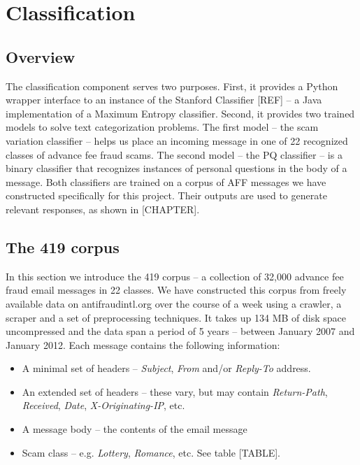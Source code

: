 \chapter{Classification}


\section{Overview}
The classification component serves two purposes. First, it provides a Python wrapper interface to an instance of the Stanford Classifier [REF] -- a Java implementation of a Maximum Entropy classifier. Second, it provides two trained models to solve text categorization problems. The first model -- the scam variation classifier -- helps us place an incoming message in one of 22 recognized classes of advance fee fraud scams. The second model -- the PQ classifier -- is a binary classifier that recognizes instances of personal questions in the body of a message. Both classifiers are trained on a corpus of AFF messages we have constructed specifically for this project. Their outputs are used to generate relevant responses, as shown in [CHAPTER].

\section{The 419 corpus}
In this section we introduce the 419 corpus -- a collection of 32,000 advance fee fraud email messages in 22 classes. We have constructed this corpus from freely available data on antifraudintl.org over the course of a week using a crawler, a scraper and a set of preprocessing techniques. It takes up 134 MB of disk space uncompressed and the data span a period of 5 years -- between January 2007 and January 2012.  Each message contains the following information:
\begin{itemize}
	\item A minimal set of headers -- \emph{Subject}, \emph{From} and/or \emph{Reply-To} address.
	\item An extended set of headers -- these vary, but may contain \emph{Return-Path}, \emph{Received}, \emph{Date}, \emph{X-Originating-IP}, etc.
	\item A message body -- the contents of the email message
	\item Scam class -- e.g. \emph{Lottery}, \emph{Romance}, etc. See table [TABLE].
\end{itemize}

